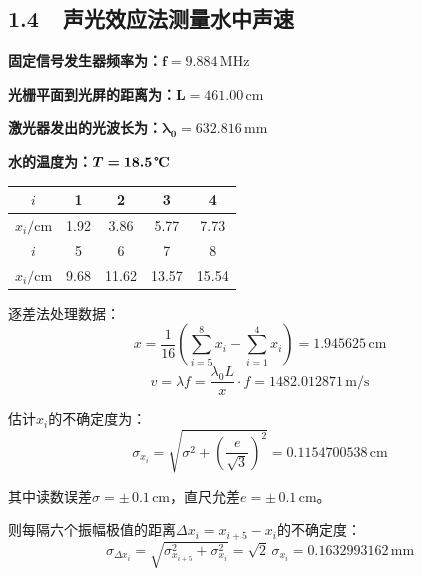 \documentclass[a4paper,fontset=windows]{ctexart}
\begin{document}
    \vspace{3em}
    \subsection*{ 1.4\ \ 声光效应法测量水中声速}

    \textbf{固定信号发生器频率为：}$\boldsymbol{f = 9.884\,\mathrm{MHz}}$

    \textbf{光栅平面到光屏的距离为：}$\boldsymbol{L = 461.00\,\mathrm{cm}}$

    \textbf{激光器发出的光波长为：}$\boldsymbol{\lambda_0 = 632.816\,\mathrm{mm}}$

    \textbf{水的温度为：}$\boldsymbol{T = 18.5\,\text{\textbf{\textcelsius}}}$

    \vspace{0.5em}\begin{table}[ht!]\Large
        \begin{center}
            \begin{tabular}{ |c|c|c|c|c| }
                \hline
                $i$ & 1 & 2 & 3 & 4 \\
                \hline
                $x_i/\mathrm{cm}$ & 1.92 & 3.86 & 5.77 & 7.73 \\
                \hline
                $i$ & 5 & 6 & 7 & 8 \\
                \hline
                $x_i/\mathrm{cm}$ & 9.68 & 11.62 & 13.57 & 15.54 \\
                \hline
            \end{tabular}
        \end{center}
    \end{table}\vspace{-0.5em}

    逐差法处理数据：
    \[
    x = \frac{1}{16}\left(\sum\limits_{i=5}^{8}x_i - \sum\limits_{i=1}^{4}x_i\right) = 1.945625\,\mathrm{cm}
    \]
    \[
    v = \lambda f = \frac{\lambda_0 L}{x}\cdot f = 1482.012871\,\mathrm{m/s}
    \]

    估计$x_i$的不确定度为：
    \[
    \sigma_{x_i} = \sqrt{\sigma^2 + \left(\frac{e}{\sqrt{3}}\right)^2} = 0.1154700538\,\mathrm{cm}
    \]

    其中读数误差$\sigma = \pm\,0.1\,\mathrm{cm}$，直尺允差$e = \pm\,0.1\,\mathrm{cm}$。

    则每隔六个振幅极值的距离$\Delta x_i = x_{i+5}-x_i$的不确定度：
    \[
    \sigma_{\Delta x_i} = \sqrt{\sigma_{x_{i+5}}^2 + \sigma_{x_i}^2} = \sqrt{2}\,\sigma_{x_i} = 0.1632993162\,\mathrm{mm}
    \]
\end{document}
